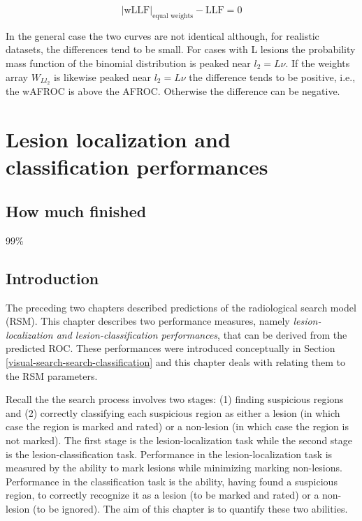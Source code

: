\documentclass[
]{book}
\begin{document}
\begin{equation} 
\left| \text{wLLF} \right|_\text{equal weights} -\text{LLF} = 0
\label{eq:rsm-other-predictions-wllf-llf-eq-weights}
\end{equation}

In the general case the two curves are not identical although, for realistic datasets, the differences tend to be small. For cases with L lesions the probability mass function of the binomial distribution is peaked near \(l_2 =L\nu\). If the weights array \(W_{Ll_2}\) is likewise peaked near \(l_2 =L\nu\) the difference tends to be positive, i.e., the wAFROC is above the AFROC. Otherwise the difference can be negative.

\hypertarget{rsm-search-classification}{%
\chapter{Lesion localization and classification performances}\label{rsm-search-classification}}

\hypertarget{rsm-search-classification-how-much-finished}{%
\section{How much finished}\label{rsm-search-classification-how-much-finished}}

99\%

\hypertarget{rsm-search-classification-intro}{%
\section{Introduction}\label{rsm-search-classification-intro}}

The preceding two chapters described predictions of the radiological search model (RSM). This chapter describes two performance measures, namely \emph{lesion-localization and lesion-classification performances}, that can be derived from the predicted ROC. These performances were introduced conceptually in Section \ref{visual-search-search-classification} and this chapter deals with relating them to the RSM parameters.

Recall the the search process involves two stages: (1) finding suspicious regions and (2) correctly classifying each suspicious region as either a lesion (in which case the region is marked and rated) or a non-lesion (in which case the region is not marked). The first stage is the lesion-localization task while the second stage is the lesion-classification task. Performance in the lesion-localization task is measured by the ability to mark lesions while minimizing marking non-lesions. Performance in the classification task is the ability, having found a suspicious region, to correctly recognize it as a lesion (to be marked and rated) or a non-lesion (to be ignored). The aim of this chapter is to quantify these two abilities.
\end{document}
